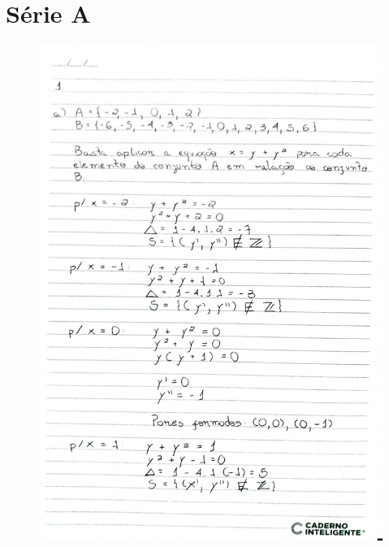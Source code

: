 \documentclass[
  12pt,     %
  openright,      %
  oneside,      %
  a4paper     %
  ]{abntex2}
\begin{document}
\section{Série A}
\begin{figure}[H]
  \centering
  \includegraphics[scale=0.23]{pagina1.jpg}
\end{figure}
\end{document}
